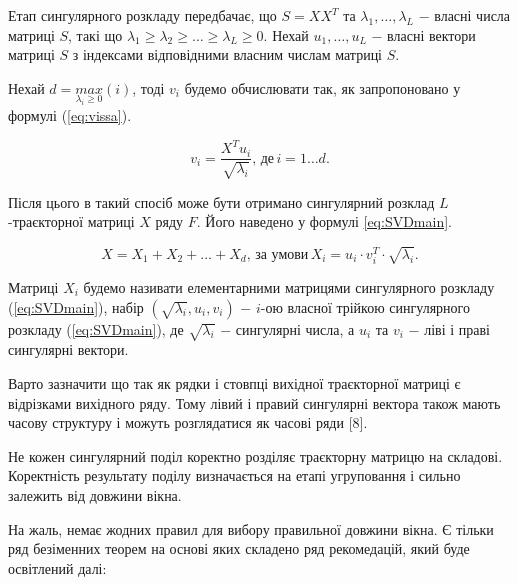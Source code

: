 \vspace{1.5em}

Етап сингулярного розкладу передбачає, що $S = XX^{T}$ та $\lambda_{1}, \dots, \lambda_{L}$ $-$ власні числа матриці $S$, такі що $\lambda_{1} \ge \lambda_{2} \ge \dots \ge \lambda_{L} \ge 0$. Нехай $u_{1}, \dots, u_{L}$ $-$ власні вектори матриці $S$ з індексами відповідними власним числам матриці $S$.

Нехай $d = \underset{\lambda_{i} \ge 0}{max}(i)$, тоді $v_{i}$ будемо обчислювати так, як запропоновано у формулі (\ref{eq:vissa}).

\begin{equation}\label{eq:vissa}
v_{i} = \frac{X^{T}u_{i}}{\sqrt{\lambda_{i}}}, \, \text{де} \, i=1 \dots d.
\end{equation}

\vspace{1.5em}

Після цього в такий спосіб може бути отримано сингулярний розклад $L$-траєкторної матриці $X$ ряду $F$. Його наведено у формулі \ref{eq:SVDmain}.

\begin{equation}\label{eq:SVDmain}
X = X_{1} + X_{2} + \dots + X_{d}, \, \text{за умови} \, X_{i} = u_{i} \cdot v_{i}^{T} \cdot \sqrt{\lambda_{i}}.
\end{equation}

\vspace{1.5em}

Матриці $X_{i}$ будемо називати елементарними матрицями сингулярного розкладу (\ref{eq:SVDmain}), набір $(\sqrt{\lambda_{i}}, u_{i}, v_{i})$ $-$ $i$-ою власної трійкою сингулярного розкладу (\ref{eq:SVDmain}), де $\sqrt{\lambda_{i}}$ $-$ сингулярні числа, а $u_{i}$ та $v_{i}$ $-$ ліві і праві сингулярні вектори.

Варто зазначити що так як рядки і стовпці вихідної траєкторної матриці є відрізками вихідного ряду. Тому лівий і правий сингулярні вектора також мають часову структуру і можуть розглядатися як часові ряди [8].

Не кожен сингулярний поділ коректно розділяє траєкторну матрицю на складові. Коректність результату поділу визначається на етапі угруповання і сильно залежить від довжини вікна.

На жаль, немає жодних правил для вибору правильної довжини вікна. Є тільки ряд безіменних теорем на основі яких складено ряд рекомедацій, який буде освітлений далі:


